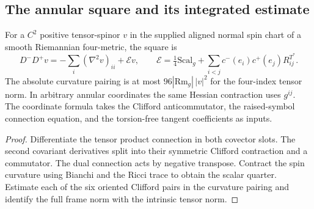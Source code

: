 \subsection{The annular square and its integrated estimate}

\begin{proposition}
\label{prop:annular-spin-square}
\leanok
For a $C^2$ positive tensor-spinor $v$ in the supplied aligned normal spin
chart of a smooth Riemannian four-metric, the square is
\[
 D^-D^+v=-\sum_i(\nabla^2 v)_{ii}+\mathcal Ev,\qquad
 \mathcal E=\tfrac14\mathrm{Scal}_g+
    \sum_{i<j}c^-(e_i)c^+(e_j)R^{T^*}_{ij}.
\]
The absolute curvature pairing is at most
$96|\mathrm{Rm}_g|\,|v|^2$ for the four-index tensor norm.
In arbitrary annular coordinates the same Hessian contraction uses $g^{ij}$.
The coordinate formula takes the Clifford anticommutator, the raised-symbol
connection equation, and the torsion-free tangent coefficients as inputs.
\end{proposition}
\begin{proof}
\leanok
Differentiate the tensor product connection in both covector slots.
The second covariant derivatives split into their symmetric Clifford
contraction and a commutator. The dual connection acts by negative
transpose. Contract the spin curvature using Bianchi and the Ricci
trace to obtain the scalar quarter. Estimate each of the six oriented
Clifford pairs in the curvature pairing and identify the full frame
norm with the intrinsic tensor norm.
\end{proof}

